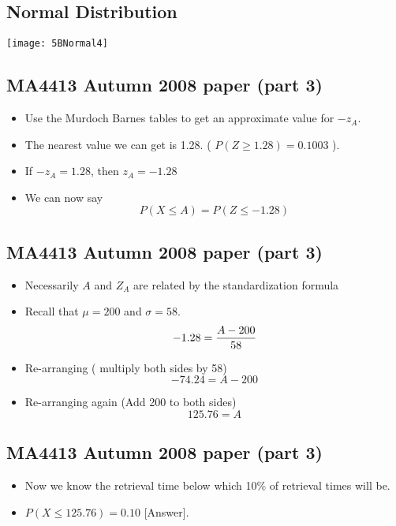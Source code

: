 {
\subsection*{Normal Distribution}

\begin{center}
\texttt{[image: 5BNormal4]}
\end{center}

}
{
\subsection*{MA4413 Autumn 2008 paper (part 3)}
\begin{itemize}
\item Use the Murdoch Barnes tables to get an approximate value for $-z_A$.
\item The nearest value we can get is 1.28. ( $P( Z \geq 1.28) = 0.1003$ ).
\item If $-z_A = 1.28$, then $z_A=-1.28$
\item We can now say
\[ P(X \leq A) = P(Z \leq -1.28) \]

\end{itemize}
}
{
\subsection*{MA4413 Autumn 2008 paper (part 3)}
\begin{itemize}
\item Necessarily $A$ and $Z_A$ are related by the standardization formula
\item Recall that $\mu = 200$ and $\sigma = 58$.
\[ -1.28  = {A - 200 \over 58} \]
\item Re-arranging ( multiply both sides by 58)
\[ -74.24  = A - 200 \]
\item Re-arranging again (Add 200 to both sides)
\[ 125.76 =  A \]
\end{itemize}
}
{
\subsection*{MA4413 Autumn 2008 paper (part 3)}
\begin{itemize}
\item Now we know the retrieval time below which 10\% of retrieval times will be.
\item $P(X \leq 125.76) = 0.10$ [Answer].
\end{itemize}
}
 

